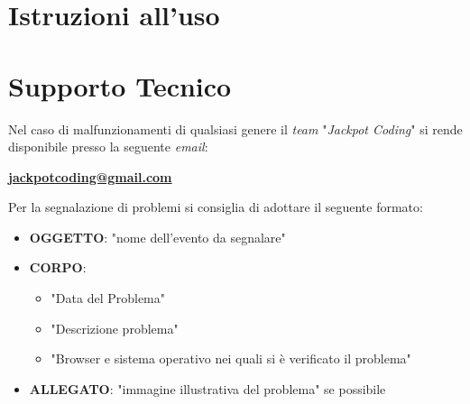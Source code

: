\documentclass[5pt]{article}
\begin{document}
        \section{Istruzioni all'uso}
        
        \section{Supporto Tecnico}
        Nel caso di malfunzionamenti di qualsiasi genere il \textit{team} "\textit{Jackpot Coding}" si rende disponibile presso la seguente \textit{email}:
        \begin{center}
        \textbf{\url{jackpotcoding@gmail.com}}
        \end{center}

        Per la segnalazione di problemi si consiglia di adottare il seguente formato:
\begin{itemize}
    \item \textbf{OGGETTO}: "nome dell'evento da segnalare"
    \item \textbf{CORPO}:
    \begin{itemize}
        \item "Data del Problema"
        \item "Descrizione problema"
        \item "Browser e sistema operativo nei quali si è verificato il problema"
    \end{itemize}
    \item \textbf{ALLEGATO}: "immagine illustrativa del problema" se possibile
\end{itemize}
        
        
        
			
\end{document}
